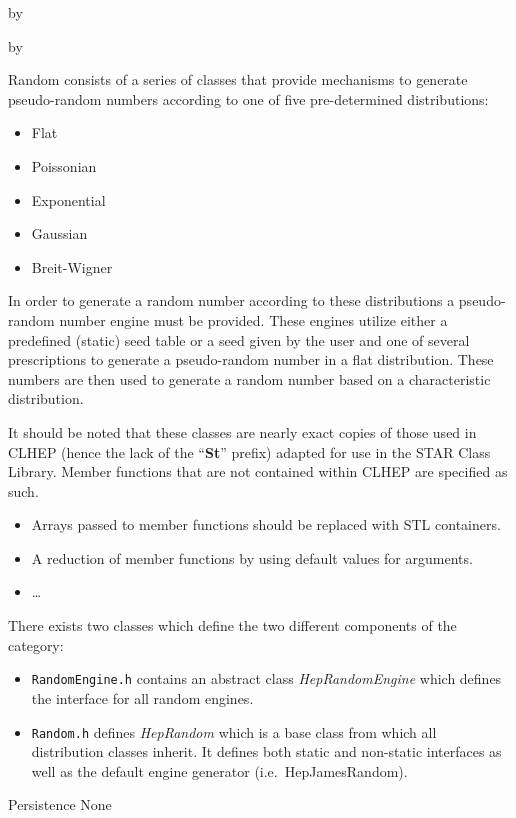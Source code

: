 \documentclass[twoside]{article}
\newcommand{\comp}[1]{\texttt{#1}}%
\newcommand{\entrylabel}[1]{\mbox{\textbf{{#1}}}\hfil}%
\newenvironment{entry}
{\begin{list}{}%
    {\renewcommand{\makelabel}{\entrylabel}%
     \setlength{\labelwidth}{90pt}%
     \setlength{\leftmargin}{\labelwidth}
     \advance\leftmargin by \labelsep%
      }%
    }%
  {\end{list}}
\newcommand{\Entrylabel}[1]%
{\raisebox{0pt}[1ex][0pt]{\makebox[\labelwidth][l]%
    {\parbox[t]{\labelwidth}{\hspace{0pt}\textbf{{#1}}}}}}
\newenvironment{Entry}%
{\renewcommand{\entrylabel}{\Entrylabel}\begin{entry}}%
  {\end{entry}}
\begin{document}
\begin{description}
\begin{Entry}
\begin{Entry}
  Random consists of a series of classes that provide mechanisms to
  generate pseudo-random numbers according to one of five pre-determined
  distributions:
  \begin{itemize}
   \item Flat
   \item Poissonian
   \item Exponential
   \item Gaussian
   \item Breit-Wigner
  \end{itemize}

  In order to generate a random number according to these distributions
  a pseudo-random number engine must be provided.  These engines
  utilize either a predefined (static) seed table 
  or a seed given by the user and one of several prescriptions
  to generate a pseudo-random
  number in a flat distribution.  These numbers are then used to generate
  a random number based on a characteristic distribution.
  
  It should be noted that these classes are nearly exact copies of those
  used in CLHEP (hence the lack of the ``{\bf St}'' prefix)
  adapted for use in the STAR Class Library.  Member functions that
  are not contained within CLHEP are specified as such.
  
  \begin{itemize}
    \item Arrays passed to member functions should be replaced with
      STL containers.
    \item A reduction of member functions by using default values for
      arguments.
    \item \ldots
  \end{itemize}
  
  There exists two classes which define the two different components
  of the category:
  \begin{itemize}
    \item \comp{RandomEngine.h} contains an abstract class {\em HepRandomEngine}
      which defines the interface for all random engines.
    \item \comp{Random.h} defines  {\em HepRandom} which is a base class
      from which all distribution classes inherit.  It defines both
      static and non-static interfaces as well as the default engine
      generator (i.e.~HepJamesRandom).
    \end{itemize}
    
\item[Persistence]
    None


\end{Entry}
\end{Entry}
\end{description}
\end{document}
